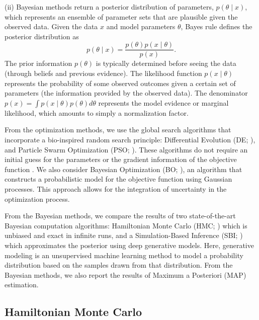\documentclass[preprint,11pt,authoryear]{elsarticle}
\begin{document}
(ii) Bayesian methods return a posterior distribution of parameters, $ p(\theta \mid x)$, which represents an ensemble of parameter sets that are plausible given the observed data. Given the data $x$ and model parameters $\theta$, Bayes rule defines the posterior distribution as
\begin{equation}
    p(\theta \mid x) = \frac{p(\theta) p(x \mid \theta)}{p(x)}. \label{eq:Bayes_rule}
\end{equation}
The prior information $p(\theta)$ is typically determined before seeing the data (through beliefs and previous evidence). The likelihood function $p(x \mid \theta)$ represents the probability of some observed outcomes given a certain set of parameters (the information provided by the observed data). The denominator $p(x)=\int p(x \mid \theta)p(\theta)d\theta$ represents the model evidence or marginal likelihood, which amounts to simply a normalization factor.


From the optimization methods, we use the global search algorithms that incorporate a bio-inspired random search principle: Differential Evolution (DE; \cite{Storn1997, Price1999}), and Particle Swarm Optimization (PSO; \cite{Kennedy1995, Eberhart1995}). These algorithms do not require an initial guess for the parameters or the gradient information of the objective function \citep{Hashemi2018}.  We also consider Bayesian Optimization (BO; \cite{Snoek2012, Shahriari2015}), an algorithm that constructs a probabilistic model for the objective function using Gaussian processes. This approach allows for the integration of uncertainty in the optimization process.


From the Bayesian methods, we compare the results of two state-of-the-art Bayesian computation algorithms: Hamiltonian Monte Carlo (HMC; \cite{Duane1987, Neal2010}) which is unbiased and exact in infinite runs, and a Simulation-Based Inference (SBI; \cite{Cranmer2020, Brehmer2021}) which approximates the posterior using deep generative models. Here, generative modeling is an unsupervised machine learning method to model a probability distribution based on the samples drawn from that distribution.  From the Bayesian methods, we also report the results of Maximum a Posteriori (MAP) estimation. 



\subsection{Hamiltonian Monte Carlo}
\end{document}
